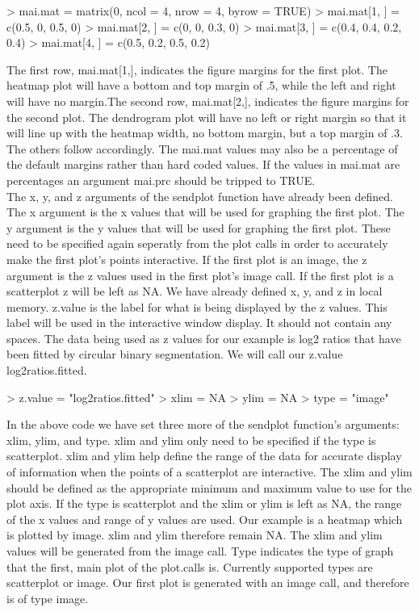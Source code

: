 \documentclass[]{article}
\begin{document}
\begin{Schunk}
\begin{Sinput}
> mai.mat = matrix(0, ncol = 4, nrow = 4, byrow = TRUE)
> mai.mat[1, ] = c(0.5, 0, 0.5, 0)
> mai.mat[2, ] = c(0, 0, 0.3, 0)
> mai.mat[3, ] = c(0.4, 0.4, 0.2, 0.4)
> mai.mat[4, ] = c(0.5, 0.2, 0.5, 0.2)
\end{Sinput}
\end{Schunk}
\quad The first row, mai.mat[1,], indicates the figure margins for the first plot. The heatmap plot will have a bottom and top margin of .5, while the left and right will have no margin.The second row, mai.mat[2,], indicates the figure margins for the second plot. The dendrogram plot will have no left or right margin so that it will line up with the heatmap width, no bottom margin, but a top margin of .3. The  others follow accordingly.  The mai.mat values may also be a percentage of the default margins rather than hard coded values. If the values in mai.mat are percentages an argument mai.prc should be tripped to TRUE.\\


\quad The x, y, and z arguments of the sendplot function have already been defined. The x argument is the x values that will be used for graphing the first plot. The y argument is the y values that will be used for graphing the first plot. These need to be specified again seperatly from the plot calls in order to accurately make the first plot's points interactive. If the first plot is an image, the z argument is the z values used in the first plot's image call. If the first plot is a scatterplot z will be left as NA. We have already defined x, y, and z in local memory. z.value is the label for what is being displayed by the z values. This label will be used in the interactive window display. It should not contain any spaces. The data being used as z values for our example is log2 ratios that have been fitted by circular binary segmentation. We will call our z.value log2ratios.fitted.

\begin{Schunk}
\begin{Sinput}
> z.value = "log2ratios.fitted"
> xlim = NA
> ylim = NA
> type = "image"
\end{Sinput}
\end{Schunk}
\quad In the above code we have set three more of the sendplot function's arguments: xlim, ylim, and type. xlim and ylim only need to be specified if the type is scatterplot. xlim and ylim help define the range of the data for accurate display of information when the points of a scatterplot are interactive. The xlim and ylim should be defined as the appropriate minimum and maximum value to use for the plot axis. If the type is scatterplot and the xlim or ylim is left as NA, the range of the x values and range of y values are used. Our example is a heatmap which is plotted by image. xlim and ylim therefore remain NA. The xlim and ylim values will be generated from the image call. Type indicates the type of graph that the first, main plot of the plot.calls is. Currently supported types are scatterplot or image. Our first plot is generated with an image call, and therefore is of type image.  
\end{document}
